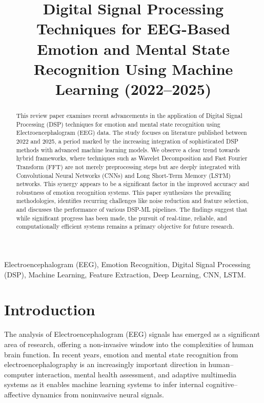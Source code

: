 \documentclass[conference]{IEEEtran}
\begin{document}
\title{Digital Signal Processing Techniques for EEG-Based Emotion and Mental State Recognition Using Machine Learning (2022–2025)}

\author{
}

\maketitle

\begin{abstract} 
This review paper examines recent advancements in the application of Digital Signal Processing (DSP) techniques for emotion and mental state recognition using Electroencephalogram (EEG) data. The study focuses on literature published between 2022 and 2025, a period marked by the increasing integration of sophisticated DSP methods with advanced machine learning models. We observe a clear trend towards hybrid frameworks, where techniques such as Wavelet Decomposition and Fast Fourier Transform (FFT) are not merely preprocessing steps but are deeply integrated with Convolutional Neural Networks (CNNs) and Long Short-Term Memory (LSTM) networks. This synergy appears to be a significant factor in the improved accuracy and robustness of emotion recognition systems. This paper synthesizes the prevailing methodologies, identifies recurring challenges like noise reduction and feature selection, and discusses the performance of various DSP-ML pipelines. The findings suggest that while significant progress has been made, the pursuit of real-time, reliable, and computationally efficient systems remains a primary objective for future research.
\end{abstract}

\begin{IEEEkeywords}
Electroencephalogram (EEG), Emotion Recognition, Digital Signal Processing (DSP), Machine Learning, Feature Extraction, Deep Learning, CNN, LSTM.
\end{IEEEkeywords}

\section{Introduction}
The analysis of Electroencephalogram (EEG) signals has emerged as a significant area of research, offering a non-invasive window into the complexities of human brain function. In recent years, emotion and mental state recognition from electroencephalography is an increasingly important direction in human–computer interaction, mental health assessment, and adaptive multimedia systems as it enables machine learning systems to infer internal cognitive–affective dynamics from noninvasive neural signals. 
\end{document}
